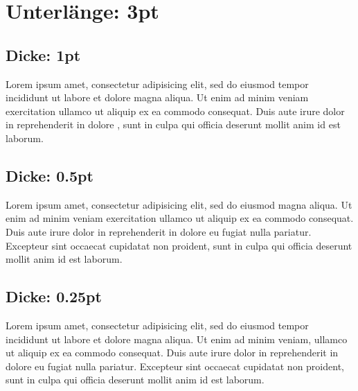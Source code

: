 \documentclass{article}
\begin{document}
\section{Unterlänge: 3pt}

\lueckeunterlaenge{3pt}

\subsection{Dicke: 1pt}

\lueckedicke{1pt}

Lorem ipsum  amet, consectetur adipisicing elit, sed
do eiusmod tempor incididunt ut labore et dolore magna aliqua. Ut enim
ad minim veniam exercitation ullamco  ut aliquip ex
ea commodo consequat. Duis aute irure dolor in reprehenderit in
 dolore , sunt in culpa
qui officia deserunt mollit anim id est laborum.

\subsection{Dicke: 0.5pt}

\lueckedicke{0.5pt}

Lorem ipsum  amet, consectetur adipisicing elit, sed
do eiusmod  magna aliqua.
Ut enim ad minim veniam exercitation ullamco  ut
aliquip ex ea commodo consequat. Duis aute irure dolor in reprehenderit
in  dolore eu fugiat nulla pariatur.
Excepteur sint occaecat cupidatat non proident, sunt in culpa qui
officia deserunt mollit anim id est laborum.

\subsection{Dicke: 0.25pt}

\lueckedicke{0.25pt}

Lorem ipsum  amet, consectetur adipisicing elit, sed
do eiusmod tempor incididunt ut labore et dolore magna aliqua. Ut enim
ad minim veniam, ullamco  ut aliquip
ex ea commodo consequat. Duis aute irure dolor in reprehenderit in
 dolore eu fugiat nulla pariatur.
Excepteur sint occaecat cupidatat non proident, sunt in culpa qui
officia deserunt mollit anim id est laborum.
\end{document}
